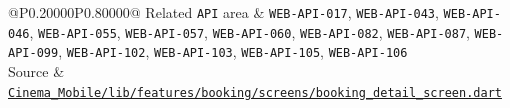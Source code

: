 \begin{longtable}{@{}P{0.20000\SRSWidth}P{0.80000\SRSWidth}@{}}
Related \texttt{API} area & \texttt{WEB-\allowbreak{}API-\allowbreak{}017}, \texttt{WEB-\allowbreak{}API-\allowbreak{}043}, \texttt{WEB-\allowbreak{}API-\allowbreak{}046}, \texttt{WEB-\allowbreak{}API-\allowbreak{}055}, \texttt{WEB-\allowbreak{}API-\allowbreak{}057}, \texttt{WEB-\allowbreak{}API-\allowbreak{}060}, \texttt{WEB-\allowbreak{}API-\allowbreak{}082}, \texttt{WEB-\allowbreak{}API-\allowbreak{}087}, \texttt{WEB-\allowbreak{}API-\allowbreak{}099}, \texttt{WEB-\allowbreak{}API-\allowbreak{}102}, \texttt{WEB-\allowbreak{}API-\allowbreak{}103}, \texttt{WEB-\allowbreak{}API-\allowbreak{}105}, \texttt{WEB-\allowbreak{}API-\allowbreak{}106} \\[3pt]
Source & \href{../../../Cinema\_Mobile/lib/features/booking/screens/booking\_detail\_screen.dart}{\texttt{Cinema\_\allowbreak{}Mobile/\allowbreak{}lib/\allowbreak{}features\allowbreak{}/\allowbreak{}booking/\allowbreak{}screens/\allowbreak{}booking\_\allowbreak{}detail\_\allowbreak{}screen.\allowbreak{}dart}} \\[3pt]
\end{longtable}
\endgroup

